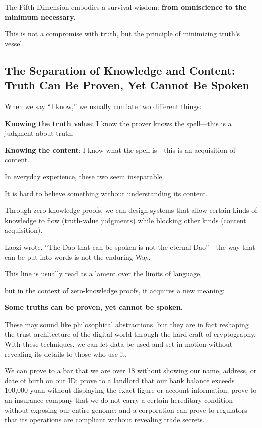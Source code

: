 The Fifth Dimension embodies a survival wisdom: \textbf{from omniscience to the minimum necessary.}

This is not a compromise with truth, but the principle of minimizing truth's vessel.

\newpage
\subsection{The Separation of Knowledge and Content: Truth Can Be Proven, Yet Cannot Be Spoken}

When we say ``I know,'' we usually conflate two different things:

\textbf{Knowing the truth value}: I know the prover knows the spell---this is a judgment about truth.

\textbf{Knowing the content}: I know what the spell is---this is an acquisition of content.

In everyday experience, these two seem inseparable.

\begin{importantbox}
It is hard to believe something without understanding its content.
\end{importantbox}

Through zero-knowledge proofs, we can design systems that allow certain kinds of knowledge to flow (truth-value judgments) while blocking other kinds (content acquisition).

\vspace{1em}

Laozi wrote, ``The Dao that can be spoken is not the eternal Dao''---the way that can be put into words is not the enduring Way.

This line is usually read as a lament over the limits of language,

but in the context of zero-knowledge proofs, it acquires a new meaning:

\textbf{Some truths can be proven, yet cannot be spoken.}

\vspace{1em}

These may sound like philosophical abstractions, but they are in fact reshaping the trust architecture of the digital world through the hard craft of cryptography. With these techniques, we can let data be used and set in motion without revealing its details to those who use it.

We can prove to a bar that we are over 18 without showing our name, address, or date of birth on our ID; prove to a landlord that our bank balance exceeds 100,000 yuan without displaying the exact figure or account information; prove to an insurance company that we do not carry a certain hereditary condition without exposing our entire genome; and a corporation can prove to regulators that its operations are compliant without revealing trade secrets.


